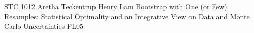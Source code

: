 	{STC 1012}	%
	{Aretha Teckentrup}		%
	{Henry Lam}	%
	{Bootstrap with One (or Few) Resamples: Statistical Optimality and an Integrative View on Data and Monte Carlo Uncertainties}	%
	{PL05}			%
	\\\hline
